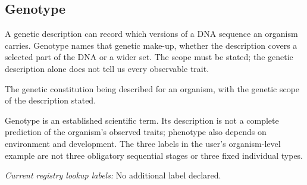 \subsection*{Genotype}
\noindent A genetic description can record which versions of a DNA sequence an organism carries. Genotype names that genetic make-up, whether the description covers a selected part of the DNA or a wider set. The scope must be stated; the genetic description alone does not tell us every observable trait.\par
\noindent The genetic constitution being described for an organism, with the genetic scope of the description stated.\par
\noindent Genotype is an established scientific term. Its description is not a complete prediction of the organism’s observed traits; phenotype also depends on environment and development. The three labels in the user’s organism-level example are not three obligatory sequential stages or three fixed individual types.\par


\noindent\textit{Current registry lookup labels:} No additional label declared.\par


